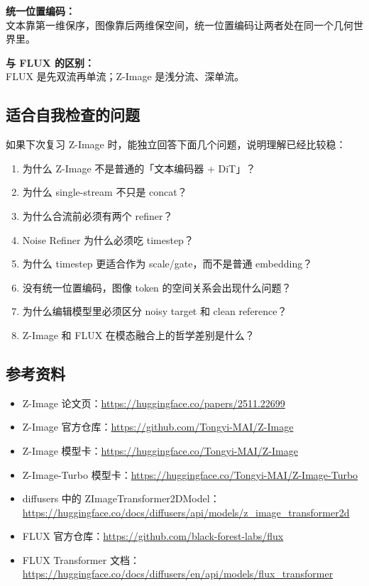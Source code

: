 \begin{summarybox}
\textbf{统一位置编码：}\\
文本靠第一维保序，图像靠后两维保空间，统一位置编码让两者处在同一个几何世界里。
\end{summarybox}

\begin{summarybox}
\textbf{与 FLUX 的区别：}\\
FLUX 是先双流再单流；Z-Image 是浅分流、深单流。
\end{summarybox}

\subsection{适合自我检查的问题}

如果下次复习 Z-Image 时，能独立回答下面几个问题，说明理解已经比较稳：

\begin{enumerate}[leftmargin=1.5em]
  \item 为什么 Z-Image 不是普通的「文本编码器 + DiT」？
  \item 为什么 single-stream 不只是 concat？
  \item 为什么合流前必须有两个 refiner？
  \item Noise Refiner 为什么必须吃 timestep？
  \item 为什么 timestep 更适合作为 scale/gate，而不是普通 embedding？
  \item 没有统一位置编码，图像 token 的空间关系会出现什么问题？
  \item 为什么编辑模型里必须区分 noisy target 和 clean reference？
  \item Z-Image 和 FLUX 在模态融合上的哲学差别是什么？
\end{enumerate}

\subsection{参考资料}

\begin{itemize}[leftmargin=1.5em]
  \item Z-Image 论文页：\url{https://huggingface.co/papers/2511.22699}
  \item Z-Image 官方仓库：\url{https://github.com/Tongyi-MAI/Z-Image}
  \item Z-Image 模型卡：\url{https://huggingface.co/Tongyi-MAI/Z-Image}
  \item Z-Image-Turbo 模型卡：\url{https://huggingface.co/Tongyi-MAI/Z-Image-Turbo}
  \item diffusers 中的 ZImageTransformer2DModel：\url{https://huggingface.co/docs/diffusers/api/models/z_image_transformer2d}
  \item FLUX 官方仓库：\url{https://github.com/black-forest-labs/flux}
  \item FLUX Transformer 文档：\url{https://huggingface.co/docs/diffusers/en/api/models/flux_transformer}
\end{itemize}

